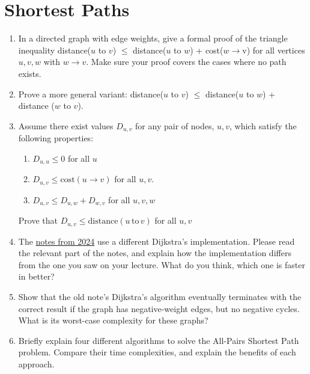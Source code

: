 \documentclass{article}
\begin{document}
\section{Shortest Paths}

\begin{enumerate}
    \item In a directed graph with edge weights, give a formal proof of the triangle inequality
distance($u$ to $v$) $\leq$ distance($u$ to $w$) + cost($w \rightarrow $v) for all vertices $u,v,w$ with $w \rightarrow v$.
Make sure your proof covers the cases where no path exists.
\item Prove a more general variant: distance($u$ to $v$) $\leq$ distance($u$ to $w$) + distance ($w$ to $v$).

\item Assume there exist values $D_{u,v}$ for any pair of nodes, $u,v$, which satisfy the following properties:
\begin{enumerate}
    \item $D_{u,u}\leq 0$ for all $u$
    \item $D_{u,v}\leq \mathrm{cost}(u\rightarrow v)$ for all $u,v$.
    \item $D_{u,v}\leq D_{u,w} + D_{w,v}$ for all $u,v,w$
\end{enumerate}

Prove that $D_{u,v} \leq \mathrm{distance}(u\,\mathrm{to}\,v )$ for all $u,v$

\item The \href{https://www.cl.cam.ac.uk/teaching/2324/Algorithm1/content/algorithms2.pdf}{notes from 2024} use a different Dijkstra's implementation. Please read the relevant part of the notes, and explain how the implementation differs from the one you saw on your lecture. What do you think, which one is faster in better?

\item Show that the old note's Dijkstra's algorithm eventually terminates with the correct result if the graph has negative-weight edges, but no negative cycles. What is its worst-case complexity for these graphs?

\item Briefly explain four different algorithms to solve the All-Pairs Shortest Path problem. Compare their time complexities, and explain the benefits of each approach.
\end{enumerate}
\end{document}
